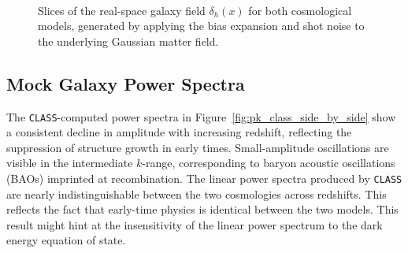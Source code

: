 \documentclass[trackchanges]{aastex7}
\begin{document}
\begin{figure}[ht]
    \centering
    \\[0.5em]
    \caption{Slices of the real-space galaxy field \(\delta_h(x)\) for both cosmological models, generated by applying the bias expansion and shot noise to the underlying Gaussian matter field.}
    \label{fig:galaxy_slices_stacked}
\end{figure}
\clearpage

\clearpage
\subsection{Mock Galaxy Power Spectra}

The \texttt{CLASS}-computed power spectra in Figure~\ref{fig:pk_class_side_by_side} show a consistent decline in amplitude with increasing redshift, reflecting the suppression of structure growth in early times. 
Small-amplitude oscillations are visible in the intermediate $k$-range, corresponding to baryon acoustic oscillations (BAOs) imprinted at recombination. 
The linear power spectra produced by \texttt{CLASS} are nearly indistinguishable between the two cosmologies across redshifts. 
This reflects the fact that early-time physics is identical between the two models. 
This result might hint at the insensitivity of the linear power spectrum to the dark energy equation of state.
\end{document}
